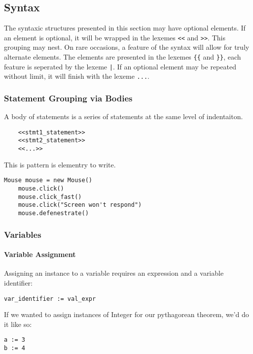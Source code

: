 \subsection{Syntax}
The syntaxic structures presented in this section may have optional elements. If an element is optional, it will be wrapped in the lexemes \verb!<<! and \verb!>>!. This grouping may nest. On rare occasions, a feature of the syntax will allow for truly alternate elements. The elements are presented in the lexemes \verb!{{! and \verb!}}!, each feature is seperated by the lexeme \verb!|!. If an optional element may be repeated without limit, it will finish with the lexeme \verb!...!.
\subsubsection{Statement Grouping via Bodies}
A body of statements is a series of statements at the same level of indentaiton.

\begin{lstlisting}
	<<stmt1_statement>>
	<<stmt2_statement>>
	<<...>>
\end{lstlisting}

This is pattern is elementry to write.

\begin{lstlisting}[caption=Statement Grouping of a Typical Interface Simulator,backgroundcolor=\color{tintedorange}]
	Mouse mouse = new Mouse()
	mouse.click()
	mouse.click_fast()
	mouse.click("Screen won't respond")
	mouse.defenestrate()
\end{lstlisting}

\subsubsection{Variables}
\paragraph{Variable Assignment}
Assigning an instance to a variable requires an expression and a variable identifier:

\begin{lstlisting}
var_identifier := val_expr
\end{lstlisting}

If we wanted to assign instances of Integer for our pythagorean theorem, we'd do it like so:

\begin{lstlisting}[caption=Variable Assignment for the Pythagorean Theorem,backgroundcolor=\color{tintedorange}]
a := 3
b := 4
\end{lstlisting}

